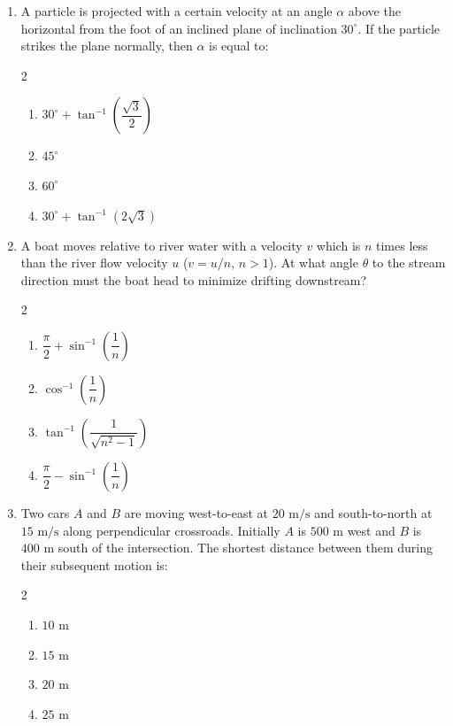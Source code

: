 \documentclass[11pt,a4paper]{article}
\begin{document}
\begin{enumerate}[label=\textbf{\textcolor{l3Crimson}{Q\arabic*.}},leftmargin=24pt,itemsep=10pt,start=51]

  \item A particle is projected with a certain velocity at an angle $\alpha$ above the horizontal from the foot of an inclined plane of inclination $30^\circ$. If the particle strikes the plane normally, then $\alpha$ is equal to:
  \begin{multicols}{2}
  \begin{enumerate}[label=\textbf{\textcolor{primaryDark}{(\Alph*)}},itemsep=2pt]
    \item $30^\circ + \tan^{-1}\left(\dfrac{\sqrt{3}}{2}\right)$
    \item $45^\circ$
    \item $60^\circ$
    \item $30^\circ + \tan^{-1}(2\sqrt{3})$
  \end{enumerate}
  \end{multicols}

  \item A boat moves relative to river water with a velocity $v$ which is $n$ times less than the river flow velocity $u$ ($v = u/n$, $n > 1$). At what angle $\theta$ to the stream direction must the boat head to minimize drifting downstream?
  \begin{multicols}{2}
  \begin{enumerate}[label=\textbf{\textcolor{primaryDark}{(\Alph*)}},itemsep=2pt]
    \item $\dfrac{\pi}{2} + \sin^{-1}\left(\dfrac{1}{n}\right)$
    \item $\cos^{-1}\left(\dfrac{1}{n}\right)$
    \item $\tan^{-1}\left(\dfrac{1}{\sqrt{n^2 - 1}}\right)$
    \item $\dfrac{\pi}{2} - \sin^{-1}\left(\dfrac{1}{n}\right)$
  \end{enumerate}
  \end{multicols}

  \item Two cars $A$ and $B$ are moving west-to-east at $20\text{ m/s}$ and south-to-north at $15\text{ m/s}$ along perpendicular crossroads. Initially $A$ is $500\text{ m}$ west and $B$ is $400\text{ m}$ south of the intersection. The shortest distance between them during their subsequent motion is:
  \begin{multicols}{2}
  \begin{enumerate}[label=\textbf{\textcolor{primaryDark}{(\Alph*)}},itemsep=2pt]
    \item $10\text{ m}$
    \item $15\text{ m}$
    \item $20\text{ m}$
    \item $25\text{ m}$
  \end{enumerate}
  \end{multicols}


\end{enumerate}
\end{document}
